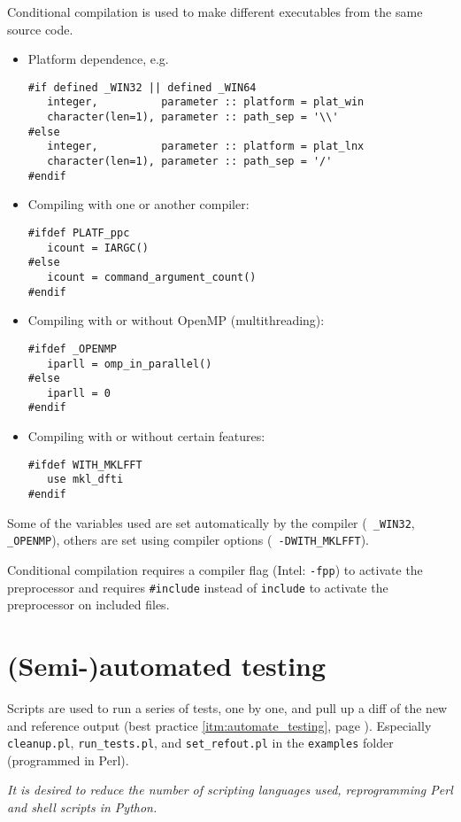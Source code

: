 \documentclass[12pt]{report}
\begin{document}
Conditional compilation is used to make different executables from the same
source code.
\begin{itemize}
\item Platform dependence, e.g.\
{\small\begin{verbatim}
#if defined _WIN32 || defined _WIN64
   integer,          parameter :: platform = plat_win
   character(len=1), parameter :: path_sep = '\\'
#else
   integer,          parameter :: platform = plat_lnx
   character(len=1), parameter :: path_sep = '/'
#endif
\end{verbatim}}
\item Compiling with one or another compiler:
{\small\begin{verbatim}
#ifdef PLATF_ppc
   icount = IARGC()
#else
   icount = command_argument_count()
#endif
\end{verbatim}}
\item Compiling with or without OpenMP (multithreading):
{\small\begin{verbatim}
#ifdef _OPENMP
   iparll = omp_in_parallel()
#else
   iparll = 0
#endif
\end{verbatim}}
\item Compiling with or without certain features:
{\small\begin{verbatim}
#ifdef WITH_MKLFFT
   use mkl_dfti
#endif
\end{verbatim}}
\end{itemize}
Some of the variables used are set automatically by the compiler ({\tt
\_WIN32}, {\tt \_OPENMP}), others are set using compiler options ({\tt
-DWITH\_MKLFFT}).

Conditional compilation requires a compiler flag (Intel: {\tt -fpp}) to
activate the preprocessor and requires \verb+#include+ instead of
\verb+include+ to activate the preprocessor on included files.

\section{(Semi-)automated testing}

Scripts are used to run a series of tests, one by one, and pull up a diff
of the new and reference output (best practice \ref{itm:automate_testing},
page \pageref{itm:automate_testing}). Especially {\tt cleanup.pl},
{\tt run\_tests.pl}, and {\tt set\_refout.pl} in the {\tt examples} folder
(programmed in Perl).

{\em It is desired to reduce the number of scripting languages used,
reprogramming Perl and shell scripts in Python.}
\end{document}
